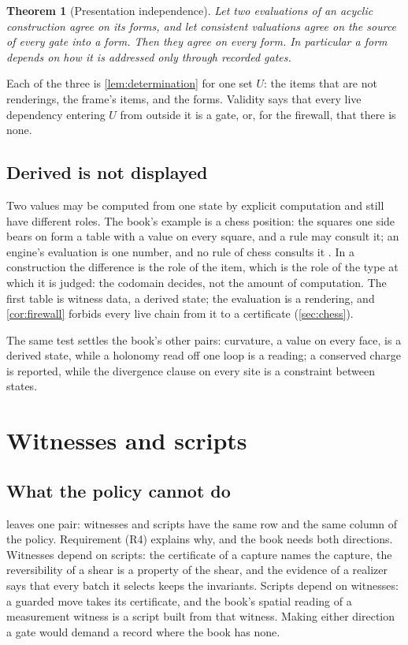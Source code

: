 \documentclass[11pt]{article}
\numberwithin{equation}{section}
\theoremstyle{definition}
\theoremstyle{plain}
\newtheorem{theorem}[definition]{Theorem}
\theoremstyle{remark}
\begin{document}
\begin{theorem}[Presentation independence]\label{thm:form-stable}
Let two evaluations of an acyclic construction agree on its forms, and let
consistent valuations agree on the source of every gate into a form.  Then
they agree on every form.  In particular a form depends on how it is
addressed only through recorded gates.
\end{theorem}

Each of the three is \cref{lem:determination} for one set \(U\): the items
that are not renderings, the frame's items, and the forms.  Validity says
that every live dependency entering \(U\) from outside it is a gate, or, for
the firewall, that there is none.

\subsection{Derived is not displayed}

Two values may be computed from one state by explicit computation and still
have different roles.  The book's example is a chess position: the squares
one side bears on form a table with a value on every square, and a rule may
consult it; an engine's evaluation is one number, and no rule of chess
consults it \cite[\S1.9]{Book}.  In a construction the difference is the role
of the item, which is the role of the type at which it is judged: the codomain
decides, not the amount of computation.  The first table is witness data, a
derived state; the evaluation is a rendering, and \cref{cor:firewall} forbids
every live chain from it to a certificate (\cref{sec:chess}).

The same test settles the book's other pairs: curvature, a value on every
face, is a derived state, while a holonomy read off one loop is a reading; a
conserved charge is reported, while the divergence clause on every site is a
constraint between states.

\section{Witnesses and scripts}\label{sec:histories}

\subsection{What the policy cannot do}

 leaves one pair: witnesses and scripts have the
same row and the same column of the policy.  Requirement (R4) explains why,
and the book needs both directions.  Witnesses depend on scripts: the
certificate of a capture names the capture, the reversibility of a shear is a
property of the shear, and the evidence of a realizer says that every batch
it selects keeps the invariants.  Scripts depend on witnesses: a guarded move
takes its certificate, and the book's spatial reading of a measurement
witness is a script built from that witness.  Making either direction a gate
would demand a record where the book has none.
\end{document}
